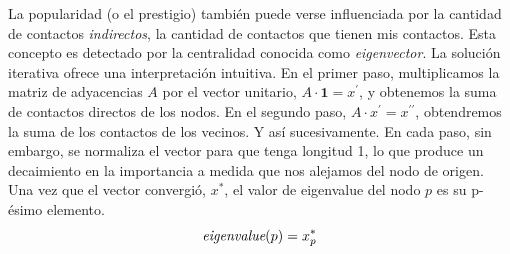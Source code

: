 \documentclass[a4paper,11pt]{book}
\theoremstyle{definition}
\begin{document}
La popularidad (o el prestigio) también puede verse influenciada por la cantidad de contactos \emph{indirectos}, la cantidad de contactos que tienen mis contactos.
%
Esta concepto es detectado por la centralidad conocida como \emph{eigenvector}.
%
La solución iterativa ofrece una interpretación intuitiva.
%
En el primer paso, multiplicamos la matriz de adyacencias $A$ por el vector unitario, $A \cdot \bm{1} = x^{\prime}$, y obtenemos la suma de contactos directos de los nodos.
%
En el segundo paso, $A \cdot x^{\prime} =  x^{\prime\prime}$, obtendremos la suma de los contactos de los vecinos.
%
Y así sucesivamente.
%
En cada paso, sin embargo, se normaliza el vector para que tenga longitud 1, lo que produce un decaimiento en la importancia a medida que nos alejamos del nodo de origen.
Una vez que el vector convergió, $x^*$, el valor de eigenvalue del nodo $p$ es su p-ésimo elemento.
%
\begin{equation}
\emph{eigenvalue}(p) = x^{*}_p
\end{equation}
\end{document}
